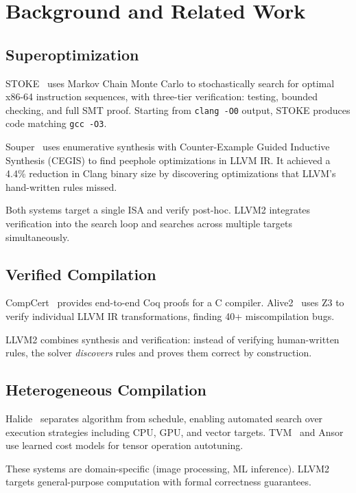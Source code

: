 \documentclass[11pt,twocolumn]{article}
\begin{document}
\section{Background and Related Work}

\subsection{Superoptimization}

STOKE~\cite{stoke} uses Markov Chain Monte Carlo to stochastically search for optimal x86-64 instruction sequences, with three-tier verification: testing, bounded checking, and full SMT proof. Starting from \texttt{clang -O0} output, STOKE produces code matching \texttt{gcc -O3}.

Souper~\cite{souper} uses enumerative synthesis with Counter-Example Guided Inductive Synthesis (CEGIS) to find peephole optimizations in LLVM IR. It achieved a 4.4\% reduction in Clang binary size by discovering optimizations that LLVM's hand-written rules missed.

Both systems target a single ISA and verify post-hoc. LLVM2 integrates verification into the search loop and searches across multiple targets simultaneously.

\subsection{Verified Compilation}

CompCert~\cite{compcert} provides end-to-end Coq proofs for a C compiler. Alive2~\cite{alive2} uses Z3 to verify individual LLVM IR transformations, finding 40+ miscompilation bugs.

LLVM2 combines synthesis and verification: instead of verifying human-written rules, the solver \emph{discovers} rules and proves them correct by construction.

\subsection{Heterogeneous Compilation}

Halide~\cite{halide} separates algorithm from schedule, enabling automated search over execution strategies including CPU, GPU, and vector targets. TVM~\cite{tvm} and Ansor~\cite{ansor} use learned cost models for tensor operation autotuning.

These systems are domain-specific (image processing, ML inference). LLVM2 targets general-purpose computation with formal correctness guarantees.
\end{document}
